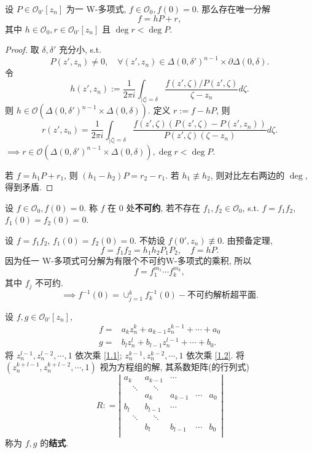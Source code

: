 \begin{theorem}[Weierstrass除法定理]  
 设 $P \in \mathcal{O}_{0'}[z_n]$ 为一 W-多项式, $f \in \mathcal{O}_{0},f(0)=0$. 那么存在唯一分解
 $$ f=hP+r, $$   
  其中 $h \in \mathcal{O}_{0},r \in \mathcal{O}_{0'}[z_n]$ 且 $\deg r < \deg P$.  
\end{theorem}
\begin{proof}
  取 $\delta ,\delta '$ 充分小, s.t. 
  $$ P(z',z_n) \neq 0, \quad \forall (z',z_n) \in \Delta (0,\delta ')^{n-1} \times \partial \Delta (0,\delta ) .$$ 
  令 
  $$ h(z',z_n):= \frac{1}{2 \pi i} \int_{|\zeta |=\delta } \frac{f(z',\zeta )/P(z',\zeta )}{\zeta -z_n} d \zeta . $$
  则 $h \in \mathcal{O}(\Delta (0,\delta ')^{n-1}\times \Delta (0,\delta ))$. 
  定义 $r:=f-hP$, 则
  $$ r(z',z_n)=\frac{1}{2 \pi i}\int_{|\zeta |=\delta } \frac{f(z',\zeta )(P(z',\zeta )-P(z',z_n))}{P(z',\zeta )(\zeta -z_n)} d \zeta .$$ 
  $\implies r \in \mathcal{O}(\Delta (0,\delta ')^{n-1}\times \Delta (0,\delta )), \deg r <\deg P$. 

  若 $f=h_1 P+r_1$, 则 $(h_1-h_2)P=r_2-r_1$. 若 $h_1 \not \equiv h_2$, 则对比左右两边的 $\deg$, 得到矛盾.     
\end{proof}

设 $f \in \mathcal{O}_0,f(0)=0$. 称 $f$ 在 $0$ 处\textbf{不可约}, 若不存在 $f_1,f_2 \in \mathcal{O}_0$, s.t. $f=f_1f_2$, $f_1(0)=f_2(0)=0$.     

设 $f=f_1f_2$, $f_1(0)=f_2(0)=0$. 不妨设 $f(0',z_n) \not \equiv 0$. 由预备定理, $$f=f_1f_2=h_1h_2P_1P_2,\quad f=hP.$$    
因为任一 W-多项式可分解为有限个不可约W-多项式的乘积, 所以
$$ f=f_{1}^{m_1} \cdots f_{k}^{m_k} ,$$
其中 $f_j$ 不可约.
$$ \implies f^{-1}(0)=\cup _{j=1}^{k}f_{k}^{-1}(0)-\text{不可约解析超平面} .$$ 

设 $f ,g \in \mathcal{O}_{0'}[z_n]$, 
\begin{align}
  f=& a_k z_{n}^k+a_{k-1}z_{n}^{k-1}+ \cdots +a_0 \label{1.1} \\ 
  g=& b_l z_{n}^l+b_{l-1}z_{n}^{l-1}+ \cdots +b_0. \label{1.2}
\end{align} 
将 $z_{n}^{l-1},z_{n}^{l-2}, \cdots,1 $  依次乘 \eqref{1.1}; 
$z_{n}^{k-1},z_{n}^{k-2}, \cdots,1 $  依次乘 \eqref{1.2}.
将 $(z_{n}^{k+l-1},z_{n}^{k+l-2}, \cdots ,1)$ 视为方程组的解, 其系数矩阵(的行列式) 
$$  R: = \left| \begin{array}{ccccc} a_{k} & a_{k-1} & \cdots  & &\\ \quad\ddots & \quad\ddots &  &  & \\ 
  & a_{k}&a_{k-1} & \cdots  & a_0\\ b_{l} & b_{l-1} & \cdots  & &\\ \quad\ddots & \quad\ddots &  &  & \\ 
  & b_{l}&b_{l-1} & \cdots  & b_0\\ \end{array} \right|  $$ 
称为 $f,g$ 的\textbf{结式}. 

